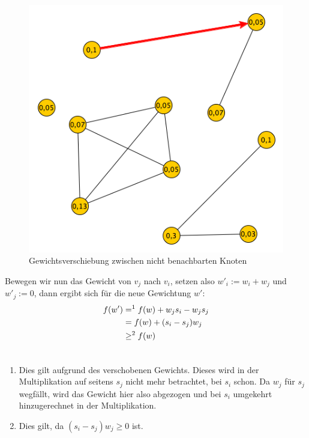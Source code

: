 \documentclass[12pt, a4paper]{article}
\begin{document}
\begin{figure}[H] 
		\centering
		\includegraphics[page=1, width=\textwidth]{assets/proof3_first_move}
		\caption{Gewichtsverschiebung zwischen nicht benachbarten Knoten} 
\end{figure}

Bewegen wir nun das Gewicht von $v_j$ nach $v_i$, setzen also $w'_i := w_i + w_j$ und $w'_j := 0$, dann ergibt sich für die neue Gewichtung $w'$:
\begin{gather}
\begin{split}f(w') &=^1 f(w) + w_j s_i - w_j s_j \\
&= f(w) + (s_i - s_j) w_j \\
&\ge^2 f(w)\end{split}\notag\\\begin{split}\end{split}\notag
\end{gather}\begin{enumerate}
\item {}
Dies gilt aufgrund des verschobenen Gewichts. Dieses wird in der Multiplikation auf seitens $s_j$ nicht mehr betrachtet, bei $s_i$ schon. Da $w_j$ für $s_j$ wegfällt, wird das Gewicht hier also abgezogen und bei $s_i$ umgekehrt hinzugerechnet in der Multiplikation.

\item {}
Dies gilt, da $(s_i - s_j) w_j \ge 0$ ist.

\end{enumerate}
\end{document}
